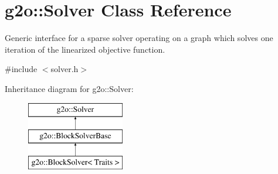 \hypertarget{classg2o_1_1_solver}{}\section{g2o\+:\+:Solver Class Reference}
\label{classg2o_1_1_solver}


Generic interface for a sparse solver operating on a graph which solves one iteration of the linearized objective function.  




{\ttfamily \#include $<$solver.\+h$>$}

Inheritance diagram for g2o\+:\+:Solver\+:\begin{figure}[H]
\begin{center}
\leavevmode
\includegraphics[height=3.000000cm]{classg2o_1_1_solver}
\end{center}
\end{figure}
